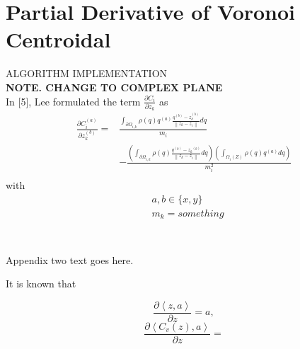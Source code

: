 \documentclass[journal]{IEEEtran}
\newcommand{\norm}[1]{\left\lVert#1\right\rVert}
\begin{document}

\section{Partial Derivative of Voronoi Centroidal}
\noindent ALGORITHM IMPLEMENTATION \\
\noindent \textbf{NOTE. CHANGE TO COMPLEX PLANE} \\
\noindent In [5], Lee formulated the term $\frac{\partial C_i}{\partial z_k}$ as 
\begin{equation} 
\begin{split}
\frac{\partial {C}^{(a)}_i}{\partial {z}^{(b)}_k} = & \frac{\int_{\partial \Omega_{i,k}} \rho(q)q^{(a)} \frac{q^{(b)} - {z}^{(b)}_k}{\norm{z_k - z_i}} dq}{m_i} \\ 
& - \frac{(\int_{\partial \Omega_{i,k}} \rho(q)\frac{q^{(b)} - {z_k}^{(b)}}{\norm{z_k - z_i}} dq)(\int_{\Omega_i(Z)}^{} \rho(q)q^{(a)}dq)}{m_i^2} \\
\end{split}
\end{equation}
with 
\begin{equation}
\begin{split}
& a,b \in \{ x,y \}   \\
& m_k = something \\ 
\end{split}
\end{equation}



\section{}
Appendix two text goes here.

It is known that

\begin{equation}
\frac{\partial \left< z,a \right>}{\partial z} =a,
\end{equation}
\begin{equation}
\frac{\partial \left< C_v(z),a \right>}{\partial z} = 
\end{equation}
\end{document}
